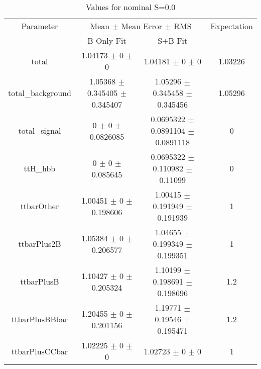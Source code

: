 \begin{table}
\centering
\caption{Values for nominal S=0.0}
\begin{tabular}{cccc}
\toprule
Parameter & \multicolumn{2}{c}{Mean $\pm$ Mean Error $\pm$ RMS} & Expectation\\
 & B-Only Fit & S+B Fit & \\
\midrule
total & \num{1.04173} $\pm$ \num{0} $\pm$ \num{0} & \num{1.04181} $\pm$ \num{0} $\pm$ \num{0} & \num{1.03226}\\
total\_background & \num{1.05368} $\pm$ \num{0.345405} $\pm$ \num{0.345407} & \num{1.05296} $\pm$ \num{0.345458} $\pm$ \num{0.345456} & \num{1.05296}\\
total\_signal & \num{0} $\pm$ \num{0} $\pm$ \num{0.0826085} & \num{0.0695322} $\pm$ \num{0.0891104} $\pm$ \num{0.0891118} & \num{0}\\
ttH\_hbb & \num{0} $\pm$ \num{0} $\pm$ \num{0.085645} & \num{0.0695322} $\pm$ \num{0.110982} $\pm$ \num{0.11099} & \num{0}\\
ttbarOther & \num{1.00451} $\pm$ \num{0} $\pm$ \num{0.198606} & \num{1.00415} $\pm$ \num{0.191949} $\pm$ \num{0.191939} & \num{1}\\
ttbarPlus2B & \num{1.05384} $\pm$ \num{0} $\pm$ \num{0.206577} & \num{1.04655} $\pm$ \num{0.199349} $\pm$ \num{0.199351} & \num{1}\\
ttbarPlusB & \num{1.10427} $\pm$ \num{0} $\pm$ \num{0.205324} & \num{1.10199} $\pm$ \num{0.198691} $\pm$ \num{0.198696} & \num{1.2}\\
ttbarPlusBBbar & \num{1.20455} $\pm$ \num{0} $\pm$ \num{0.201156} & \num{1.19771} $\pm$ \num{0.19546} $\pm$ \num{0.195471} & \num{1.2}\\
ttbarPlusCCbar & \num{1.02225} $\pm$ \num{0} $\pm$ \num{0} & \num{1.02723} $\pm$ \num{0} $\pm$ \num{0} & \num{1}\\
\bottomrule
\end{tabular}
\end{table}